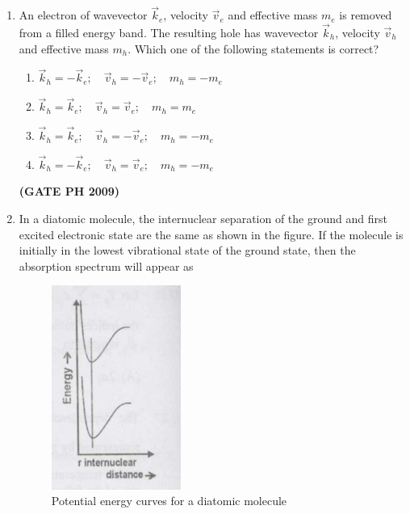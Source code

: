 \documentclass[14pt, a4paper]{extarticle}
\renewcommand{\vec}[1]{\overrightarrow{#1}}
\begin{document}
\begin{enumerate}[label=\textbf{Q. \arabic*}, start=21]
\item An electron of wavevector $\vec{k}_e$, velocity $\vec{v}_e$ and effective mass $m_e$ is removed from a filled energy band. The resulting hole has wavevector $\vec{k}_h$, velocity $\vec{v}_h$ and effective mass $m_h$. Which one of the following statements is correct?
\begin{enumerate}
\item $\vec{k}_h = -\vec{k}_e; \quad \vec{v}_h = -\vec{v}_e; \quad m_h = -m_e$
\item $\vec{k}_h = \vec{k}_e; \quad \vec{v}_h = \vec{v}_e; \quad m_h = m_e$
\item $\vec{k}_h = \vec{k}_e; \quad \vec{v}_h = -\vec{v}_e; \quad m_h = -m_e$
\item $\vec{k}_h = -\vec{k}_e; \quad \vec{v}_h = \vec{v}_e; \quad m_h = -m_e$
\end{enumerate}
\hfill \textbf{(GATE PH 2009)}

\vspace{24em}

\item In a diatomic molecule, the internuclear separation of the ground and first excited electronic state are the same as shown in the figure.
If the molecule is initially in the lowest vibrational state of the ground state, then the absorption spectrum will appear as
\begin{figure}[H]
\centering
\includegraphics[width=0.4\textwidth]{figs/Q30fig1.png}
\caption{Potential energy curves for a diatomic molecule}
\label{fig:q30_main}
\end{figure}
\begin{enumerate}
\end{enumerate}
\end{enumerate}
\end{document}
